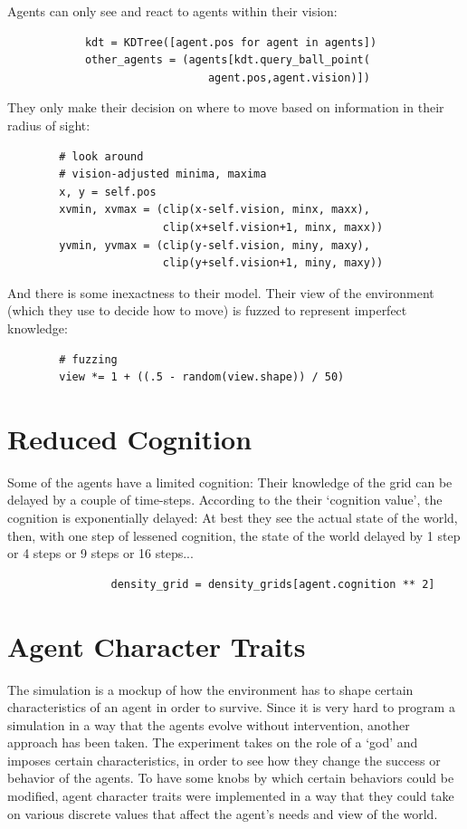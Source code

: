 \noindent
Agents can only see and react to agents within their vision:
\begin{verbatim}
            kdt = KDTree([agent.pos for agent in agents])
            other_agents = (agents[kdt.query_ball_point(
                               agent.pos,agent.vision)])
\end{verbatim}
They only make their decision on where to move based on information in their radius of sight:
\begin{verbatim}
        # look around
        # vision-adjusted minima, maxima
        x, y = self.pos
        xvmin, xvmax = (clip(x-self.vision, minx, maxx),
                        clip(x+self.vision+1, minx, maxx))
        yvmin, yvmax = (clip(y-self.vision, miny, maxy),
                        clip(y+self.vision+1, miny, maxy))
\end{verbatim}
\noindent
And there is some inexactness to their model. Their view of the environment (which they use to decide how to move) is fuzzed to represent imperfect knowledge:
\begin{verbatim}
        # fuzzing
        view *= 1 + ((.5 - random(view.shape)) / 50)
\end{verbatim}

\section{Reduced Cognition}
Some of the agents have a limited cognition: Their knowledge of the grid can be delayed by a couple of time-steps. According to the their `cognition value', the cognition is exponentially delayed:
At best they see the actual state of the world, then, with one step of lessened cognition, the state of the world delayed by 1 step or 4 steps or 9 steps or 16 steps...

\begin{verbatim}
                density_grid = density_grids[agent.cognition ** 2]
\end{verbatim}

\section{Agent Character Traits}

The simulation is a mockup of how the environment has to shape certain characteristics of an agent in order to survive. Since it is very hard to program a simulation in a way that the agents evolve without intervention, another approach has been taken. The experiment takes on the role of a `god' and imposes certain characteristics, in order to see how they change the success or behavior of the agents. To have some knobs by which certain behaviors could be modified, agent character traits were implemented in a way that they could take on various discrete values that affect the agent's needs and view of the world.

